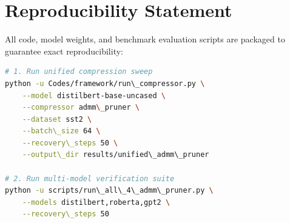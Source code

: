 \section{Reproducibility Statement}
All code, model weights, and benchmark evaluation scripts are packaged to guarantee exact reproducibility:
\begin{lstlisting}[language=bash]
# 1. Run unified compression sweep
python -u Codes/framework/run\_compressor.py \
    --model distilbert-base-uncased \
    --compressor admm\_pruner \
    --dataset sst2 \
    --batch\_size 64 \
    --recovery\_steps 50 \
    --output\_dir results/unified\_admm\_pruner

# 2. Run multi-model verification suite
python -u scripts/run\_all\_4\_admm\_pruner.py \
    --models distilbert,roberta,gpt2 \
    --recovery\_steps 50
\end{lstlisting}
